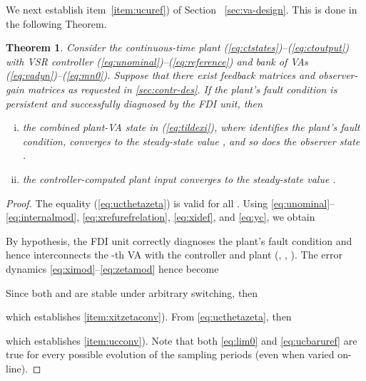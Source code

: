 \documentclass[letterpaper, 10 pt, conference]{ieeeconf}
\newtheorem{thm}{Theorem}
\begin{document}
We next establish item~\ref{item:ucuref}) of
Section ~\ref{sec:va-design}. This is done in the following Theorem.
\begin{thm}
  \label{thm:ucbar}
  Consider the continuous-time plant
  (\ref{eq:ctstates})--(\ref{eq:ctoutput}) with VSR controller
  (\ref{eq:unominal})--(\ref{eq:reference}) and bank of VAs
  (\ref{eq:vadyn})--(\ref{eq:mn0}). Suppose that there exist feedback
  matrices  and observer-gain matrices  as requested in
  \ref{sec:contr-des}. If the plant's fault
  condition is persistent and successfully diagnosed by the FDI unit, then
  \begin{enumerate}[i)]
  \item the combined plant-VA state  in (\ref{eq:tildexi}),
    where  identifies the plant's fault condition, converges to the
    steady-state value , and so does the observer
    state .\label{item:xitzetaconv}
  \item the controller-computed plant input  converges to the
    steady-state value .\label{item:ucconv}
  \end{enumerate}
\end{thm}
\begin{proof}
  The equality (\ref{eq:ucthetazeta}) is valid for all
  .  Using
  \eqref{eq:unominal}--\eqref{eq:internalmod},
  \eqref{eq:xrefurefrelation}, \eqref{eq:xidef}, and \eqref{eq:yc}, we
  obtain
  
  By hypothesis, the FDI unit correctly diagnoses the plant's fault
  condition and hence interconnects the -th VA with the controller and plant (, , ). The error dynamics 
  \eqref{eq:ximod}--\eqref{eq:zetamod} hence become
  
  Since both  and  are stable under arbitrary
  switching, then
  
  which establishes \ref{item:xitzetaconv}). From
  \eqref{eq:ucthetazeta}, then
  
  which establishes \ref{item:ucconv}). Note that both \eqref{eq:lim0}
  and \eqref{eq:ucbaruref} are true for every possible evolution of
  the sampling periods  (even when varied on-line).
\end{proof}
\end{document}
